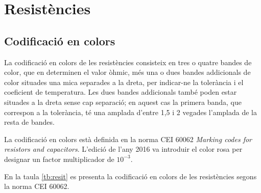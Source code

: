 \chapter{Resistències}

\section{Codificació en colors} \label{sec:resistencies-colors}

La codificació en colors  de les resistències
consisteix en tres o quatre bandes de color, que en determinen el  valor òhmic, més una o dues bandes addicionals de color situades una mica separades a la dreta, per indicar-ne la tolerància i el coeficient de temperatura. Les dues bandes addicionals també poden estar situades a la dreta sense cap separació; en aquest cas la primera banda, que correspon a la tolerància, té una amplada d'entre 1,5 i 2 vegades l'amplada de la resta de bandes.

La codificació en colors està definida en la norma CEI 60062 \textit{Marking codes for resistors and capacitors}. L'edició de l'any 2016  va introduir el color rosa per designar un factor multiplicador de $10^{-3}$.

En la taula \vref{tb:resit} es presenta la codificació en colors de les resistències segons la  norma CEI 60062.

